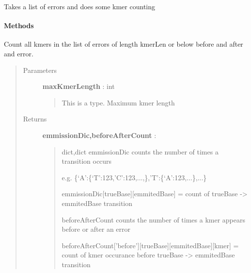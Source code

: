 \documentclass[letterpaper,10pt,english]{sphinxmanual}
\begin{document}
\begin{fulllineitems}
\label{index:proto_err.errorCount.counter}
Takes a list of errors and does some kmer counting
\paragraph{Methods}

\begin{fulllineitems}
\label{index:proto_err.errorCount.counter.countAlignedBases}
\end{fulllineitems}


\begin{fulllineitems}
\label{index:proto_err.errorCount.counter.countErrorKmer}
Count all kmers in the list of errors of length kmerLen or below before 
and after and error.
\begin{quote}\begin{description}
\item[{Parameters}] \leavevmode
\textbf{maxKmerLength} : int
\begin{quote}

This is a type.
Maximum kmer length
\end{quote}

\item[{Returns}] \leavevmode
\textbf{emmissionDic,beforeAfterCount} :
\begin{quote}

dict,dict
emmissionDic counts the number of times a transition occurs

e.g. \{`A':\{`T':123,'C':123,...,\},'T':\{`A':123,...\},...\}

emmissionDic{[}trueBase{]}{[}emmitedBase{]} = count of trueBase -\textgreater{} emmitedBase transition

beforeAfterCount counts the number of times a kmer appears before or after an error

beforeAfterCount{[}'before'{]}{[}trueBase{]}{[}emmitedBase{]}{[}kmer{]} = count of kmer occurance before trueBase -\textgreater{} emmitedBase transition


\end{quote}
\end{description}
\end{quote}
\end{fulllineitems}
\end{fulllineitems}
\end{document}
